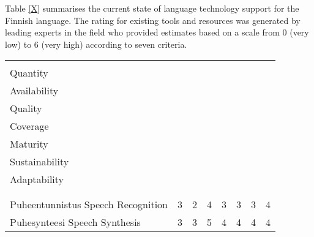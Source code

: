 \documentclass[]{../../metanetpaper}
\begin{document}
\begin{multicols}{2}
Table \ref{X} summarises the current state of language technology support
for the Finnish language. The rating for existing tools and resources was
generated by leading experts in the field who provided
estimates based on a scale from 0 (very low) to 6 (very high) according to
seven criteria.

 \begin{table}
 \centering
 \begin{tabular}{>{\columncolor[RGB]{255,190,000}}p{.33\linewidth}ccccccc}
 \toprule
 \rowcolor[RGB]{255,190,000}
  \cellcolor{white}&\begin{sideways}\makecell[l]{Määrä \\
Quantity}\end{sideways}
 &\begin{sideways}\makecell[l]{\makecell[l]{Saatavuus \\ Availability}
}\end{sideways} &\begin{sideways}\makecell[l]{Laatu \\ Quality}\end{sideways}
 &\begin{sideways}\makecell[l]{Kattavuus \\ Coverage}\end{sideways}
&\begin{sideways}\makecell[l]{Valmiusaste \\ Maturity}\end{sideways}
&\begin{sideways}\makecell[l]{Vakaus \\ Sustainability}\end{sideways}
&\begin{sideways}\makecell[l]{Soveltuvuus \\ Adaptability}\end{sideways} \\
 \midrule
 \multicolumn{8}{>{\columncolor[RGB]{255,155,000}}l}{Kieliteknologia:
työkalut, teknologiat ja sovellukset} \\\addlinespace[{-.009cm}]
 \multicolumn{8}{>{\columncolor[RGB]{255,155,000}}l}{Language Technology: Tools,
Technologies and Applications} \\
 \midrule
 Puheentunnistus \newline Speech Recognition & 3 & 2 & 4 & 3 & 3 & 3 & 4 \\
 Puhesynteesi \newline Speech Synthesis & 3 & 3 & 5 & 4 & 4 & 4 & 4 \\

\end{tabular}
\end{table}
\end{multicols}
\end{document}

